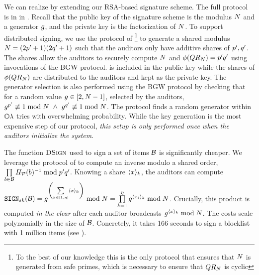 \iffalse
{} We can realize \distSigningFunc by extending our RSA-based signature scheme. The full protocol is in  in \appref{}. Recall that the public key of the signature scheme is the modulus $N$ and a generator $g$, and the private key is the factorization of $N$. To support distributed signing, we use the protocol of \citet{algesheimer2002efficient}\footnote{To the best of our knowledge this is the only protocol that ensures that $N$ is generated from safe primes, which is necessary to ensure that $QR_{N}$ is cyclic} to generate a shared modulus $\rsaMod = (2 \sgPrime[1] + 1) (2 \sgPrime[2] + 1)$ such that the auditors only have additive shares of $\sgPrime[1], \sgPrime[2]$.  
 The shares allow the auditors to securely compute $N$ and $\orderFn(\qrGroup) = \sgPrime[1] \sgPrime[2]$ using invocations of the BGW protocol. \rsaMod is included in the public key while the shares of $\phi(QR_{N})$ are distributed to the auditors and kept as the private key. The generator selection is also performed using the BGW protocol by checking that for a random value $g \in [2, N -1]$, selected by the auditors, $\qrGen^{\sgPrime[1]} \not \equiv 1 \bmod \rsaMod ~\land ~\qrGen^{\sgPrime[2]} \not \equiv 1 \bmod \rsaMod$. The protocol finds a random generator within $\mathbb{O}{\lambda}$ tries with overwhelming probability. 
While the key generation is the most expensive step of our protocol, \emph{this setup is only performed once when the auditors initialize the system}.


%
The function $\textsc{DSign}$ used to sign a set of items $\blocklist$ is significantly cheaper.  We leverage the protocol of \citet[Fig. 3]{catalano2000computing} to compute an inverse modulo a shared order, $\prod\limits_{\genericBlocklistElmt \in \blocklist}\primeRO(\genericBlocklistElmt)^{-1} \bmod \sgPrime[1] \sgPrime[2]$. Knowing a share $\langle \genericSetElmt \rangle_{\auditorIdx}$, the auditors can compute $\sign[\privKey](\blocklist) = \qrGen^{\left(\sum\limits_{\auditorIdx \in [1, \numAuditors]}\langle \genericSetElmt \rangle_{\auditorIdx}\right)}\bmod \rsaMod = \prod\limits_{\auditorIdx = 1}^{\numAuditors} \qrGen^{\langle \genericSetElmt_{\setIdx} \rangle_{\auditorIdx}} \bmod \rsaMod$. Crucially, this product is computed \emph{in the clear} after each auditor broadcasts  $\qrGen^{\langle \genericSetElmt \rangle_{\auditorIdx}} \bmod \rsaMod$. The costs scale polynomially in the size of $\blocklist$. Concretely, it takes 166 seconds to sign a blocklist with 1 million items (see ). 


